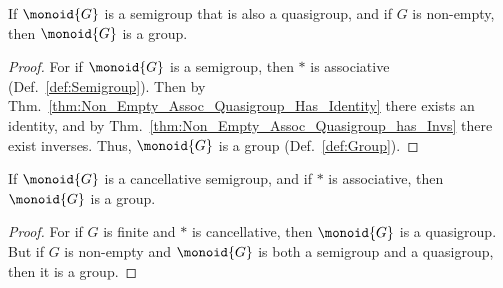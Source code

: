         \begin{theorem}
            \label{thm:Non_Empty_Assoc_Quasigroup_is_Group}%
            If $\monoid{G}$ is a semigroup that is also a quasigroup, and if
            $G$ is non-empty, then $\monoid{G}$ is a group.
        \end{theorem}
        \begin{proof}
            For if $\monoid{G}$ is a semigroup, then $*$ is associative
            (Def.~\ref{def:Semigroup}). Then by
            Thm.~\ref{thm:Non_Empty_Assoc_Quasigroup_Has_Identity} there exists
            an identity, and by
            Thm.~\ref{thm:Non_Empty_Assoc_Quasigroup_has_Invs} there exist
            inverses. Thus, $\monoid{G}$ is a group (Def.~\ref{def:Group}).
        \end{proof}
        \begin{theorem}
            If $\monoid{G}$ is a cancellative semigroup, and if $*$ is
            associative, then $\monoid{G}$ is a group.
        \end{theorem}
        \begin{proof}
            For if $G$ is finite and $*$ is cancellative, then $\monoid{G}$ is a
            quasigroup. But if $G$ is non-empty and $\monoid{G}$ is both a
            semigroup and a quasigroup, then it is a group.
        \end{proof}
